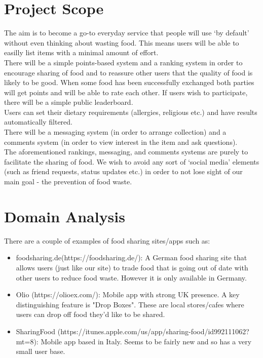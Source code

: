 \documentclass[12pt]{article}
\begin{document}
\section{Project Scope}
The aim is to become a go-to everyday service that people will use `by default' without even thinking about wasting food. This means users will be able to easilly list items with a minimal amount of effort.\\
There will be a simple points-based system and a ranking system in order to
encourage sharing of food and to reassure other users that the quality of food is
likely to be good. When some food has been successfully exchanged both
parties will get points and will be able to rate each other. If users wish to
participate, there will be a simple public leaderboard.\\
Users can set their dietary requirements (allergies, religious etc.) and have
results automatically filtered. \\
There will be a messaging system (in order to arrange collection) and a comments
system (in order to view interest in the item and ask questions).\\
The aforementioned rankings, messaging, and comments systems are purely to facilitate the sharing of food.
We wish to avoid any sort of `social media' elements
(such as friend requests, status updates etc.) in order to not lose sight of our main goal - the prevention of food waste.


\section{Domain Analysis}
There are a couple of examples of food sharing sites/apps such as:
\begin{itemize}
    \item foodsharing.de(https://foodsharing.de/): A German food sharing site
        that allows users (just like our site) to trade food that is going out
        of date with other users to reduce food waste.
        However it is only available in Germany.
    \item Olio (https://olioex.com/): Mobile app with strong UK presence.
        A key distinguishing feature is "Drop Boxes".
        These are local stores/cafes where users can drop off food they'd like
        to be shared.
    \item SharingFood
        (https://itunes.apple.com/us/app/sharing-food/id992111062?mt=8):
        Mobile app based in Italy.
        Seems to be fairly new and so has a very small user base.
\end{itemize}
\end{document}
